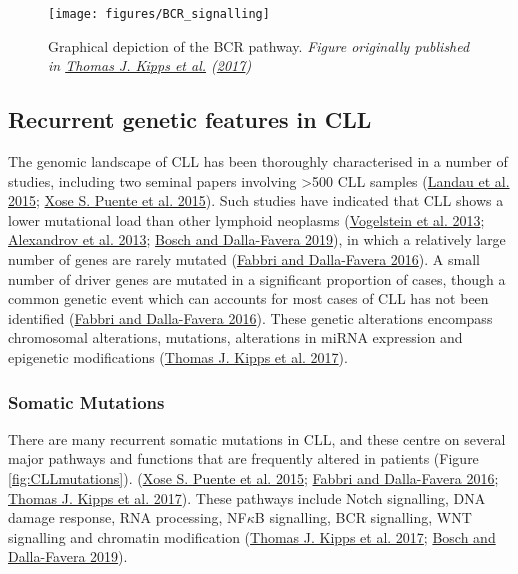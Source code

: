 \documentclass[11pt, a4paper, twosided]{book}
\begin{document}
\begin{figure}

{\centering \texttt{[image: figures/BCR\_signalling]} 

}

\caption{Graphical depiction of the BCR pathway. \emph{Figure originally published in \protect\hyperlink{ref-Kipps2017}{Thomas J. Kipps et al.} (\protect\hyperlink{ref-Kipps2017}{2017}) }}\label{fig:BCRsignalling}
\end{figure}
\hypertarget{intro-genetic-features}{%
\subsection{Recurrent genetic features in CLL}\label{intro-genetic-features}}

The genomic landscape of CLL has been thoroughly characterised in a number of studies, including two seminal papers involving \textgreater500 CLL samples (\protect\hyperlink{ref-Landau2015}{Landau et al. 2015}; \protect\hyperlink{ref-Puente2015}{Xose S. Puente et al. 2015}). Such studies have indicated that CLL shows a lower mutational load than other lymphoid neoplasms (\protect\hyperlink{ref-Vogelstein2013}{Vogelstein et al. 2013}; \protect\hyperlink{ref-Alexandrov2013}{Alexandrov et al. 2013}; \protect\hyperlink{ref-Bosch2019}{Bosch and Dalla-Favera 2019}), in which a relatively large number of genes are rarely mutated (\protect\hyperlink{ref-Fabbri2016}{Fabbri and Dalla-Favera 2016}). A small number of driver genes are mutated in a significant proportion of cases, though a common genetic event which can accounts for most cases of CLL has not been identified (\protect\hyperlink{ref-Fabbri2016}{Fabbri and Dalla-Favera 2016}). These genetic alterations encompass chromosomal alterations, mutations, alterations in miRNA expression and epigenetic modifications (\protect\hyperlink{ref-Kipps2017}{Thomas J. Kipps et al. 2017}).

\hypertarget{intro-mutations}{%
\subsubsection{Somatic Mutations}\label{intro-mutations}}

There are many recurrent somatic mutations in CLL, and these centre on several major pathways and functions that are frequently altered in patients (Figure \ref{fig:CLLmutations}). (\protect\hyperlink{ref-Puente2015}{Xose S. Puente et al. 2015}; \protect\hyperlink{ref-Fabbri2016}{Fabbri and Dalla-Favera 2016}; \protect\hyperlink{ref-Kipps2017}{Thomas J. Kipps et al. 2017}). These pathways include Notch signalling, DNA damage response, RNA processing, NF\(\kappa\)B signalling, BCR signalling, WNT signalling and chromatin modification (\protect\hyperlink{ref-Kipps2017}{Thomas J. Kipps et al. 2017}; \protect\hyperlink{ref-Bosch2019}{Bosch and Dalla-Favera 2019}).
\end{document}
